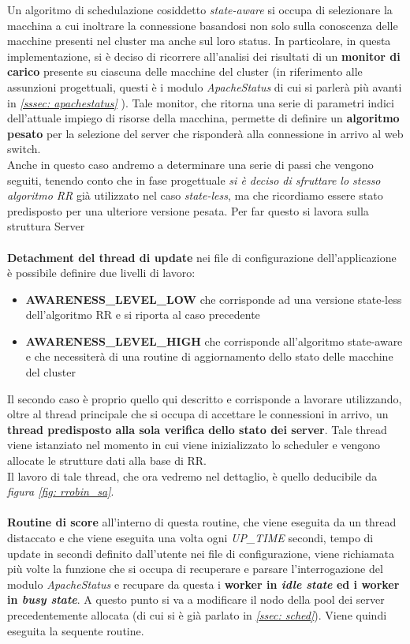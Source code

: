 \documentclass[italian]{tktltiki2}
\begin{document}
Un algoritmo di schedulazione cosiddetto \emph{state-aware} si occupa di selezionare la macchina a cui inoltrare la connessione basandosi non solo sulla conoscenza delle macchine presenti nel cluster ma anche sul loro status. In particolare, in questa implementazione, si è deciso di ricorrere all'analisi dei risultati di un \textbf{monitor di carico} presente su ciascuna delle macchine del cluster (in riferimento alle assunzioni progettuali, questi è i modulo \emph{ApacheStatus} di cui si parlerà più avanti in \emph{\ref{sssec: apachestatus}} ). Tale monitor, che ritorna una serie di parametri indici dell'attuale impiego di risorse della macchina, permette di definire un \textbf{algoritmo pesato} per la selezione del server che risponderà alla connessione in arrivo al web switch. \\
Anche in questo caso andremo a determinare una serie di passi che vengono seguiti, tenendo conto che in fase progettuale \emph{si è deciso di sfruttare lo stesso algoritmo RR} già utilizzato nel caso \emph{state-less}, ma che ricordiamo essere stato predisposto per una ulteriore versione pesata. Per far questo si lavora sulla struttura Server \\\\
\textbf{Detachment del thread di update} nei file di configurazione dell'applicazione è possibile definire due livelli di lavoro:
	\begin{itemize}
		\item \textbf{AWARENESS\_LEVEL\_LOW} che corrisponde ad una versione state-less dell'algoritmo RR e si riporta al caso precedente
		\item \textbf{AWARENESS\_LEVEL\_HIGH} che corrisponde all'algoritmo state-aware e che necessiterà di una routine di aggiornamento dello stato delle macchine del cluster
	\end{itemize}
	Il secondo caso è proprio quello qui descritto e corrisponde a lavorare utilizzando, oltre al thread principale che si occupa di accettare le connessioni in arrivo, un \textbf{thread predisposto alla sola verifica dello stato dei server}. Tale thread viene istanziato nel momento in cui viene inizializzato lo scheduler e vengono allocate le strutture dati alla base di RR. \\
	Il lavoro di tale thread, che ora vedremo nel dettaglio, è quello deducibile da \emph{figura \ref{fig: rrobin_sa}}.\\\\
\textbf{Routine di score} all'interno di questa routine, che viene eseguita da un thread distaccato e che viene eseguita una volta ogni \emph{UP\_TIME} secondi, tempo di update in secondi definito dall'utente nei file di configurazione, viene richiamata più volte la funzione che si occupa di recuperare e parsare l'interrogazione del modulo \emph{ApacheStatus} e recupare da questa i \textbf{worker in \emph{idle state} ed i worker in \emph{busy state}}. A questo punto si va a modificare il nodo della pool dei server precedentemente allocata (di cui si è già parlato in \emph{\ref{ssec: sched}}). Viene quindi eseguita la sequente routine. \\
\end{document}
